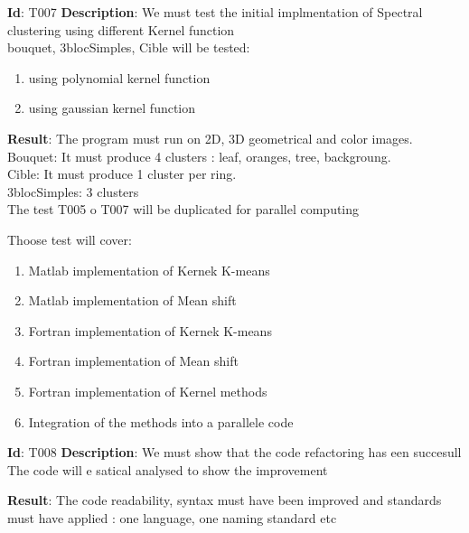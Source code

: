 \textbf{Id}: T007
\textbf{Description}: We must test the initial implmentation of Spectral clustering using different Kernel function \\
bouquet, 3blocSimples, Cible will be tested: 
\begin{enumerate}
\item using polynomial kernel function
\item using gaussian kernel function
\end{enumerate}
\textbf{Result}: The program must run on 2D, 3D geometrical and color images. \\
Bouquet: It must produce 4 clusters : leaf, oranges, tree, backgroung.\\
Cible: It must produce 1 cluster per ring.\\
3blocSimples: 3 clusters\\

The test T005 o T007 will be duplicated for parallel computing

Thoose test will cover:
\begin{enumerate}
\item Matlab implementation of Kernek K-means
\item Matlab implementation of Mean shift
\item Fortran implementation of Kernek K-means
\item Fortran implementation of Mean shift
\item Fortran implementation of Kernel methods
\item Integration of the methods into a parallele code
\end{enumerate}


\textbf{Id}: T008
\textbf{Description}: We must show that the code refactoring has een succesull \\
The code will e satical analysed to show the improvement 

\textbf{Result}: The code readability, syntax must have been improved and standards must have applied : one language, one naming standard etc\\
